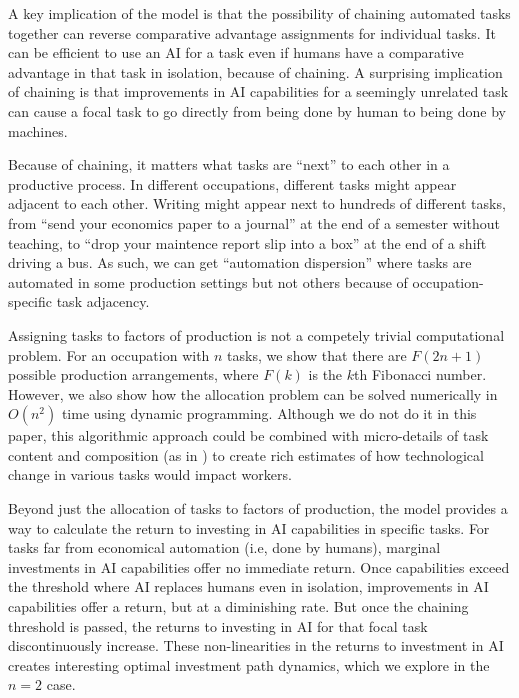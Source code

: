 \documentclass{article}
\begin{document}
A key implication of the model is that the possibility of chaining automated tasks together can reverse comparative advantage assignments for individual tasks. 
It can be efficient to use an AI for a task even if humans have a comparative advantage in that task in isolation, because of chaining.
A surprising implication of chaining is that improvements in AI capabilities for a seemingly unrelated task can cause a focal task to go directly from being done by human to being done by machines.

Because of chaining, it matters what tasks are ``next'' to each other in a productive process.
In different occupations, different tasks might appear adjacent to each other. 
Writing might appear next to hundreds of different tasks, from ``send your economics paper to a journal'' at the end of a semester without teaching, to ``drop your maintence report slip into a box'' at the end of a shift driving a bus.
As such, we can get ``automation dispersion'' where tasks are automated in some production settings but not others because of occupation-specific task adjacency.

Assigning tasks to factors of production is not a competely trivial computational problem.
For an occupation with $n$ tasks, we show that there are $F(2n + 1)$ possible production arrangements, where $F(k)$ is the $k$th Fibonacci number.
However, we also show how the allocation problem can be solved numerically in $O(n^2)$ time using dynamic programming.
Although we do not do it in this paper, this algorithmic approach could be combined with micro-details of task content and composition (as in \cite{frey2017future, felten2021occupational, eloundou2023gpts}) to create rich estimates of how technological change in various tasks would impact workers. 

Beyond just the allocation of tasks to factors of production, the model provides a way to calculate the return to investing in AI capabilities in specific tasks.
For tasks far from economical automation (i.e, done by humans), marginal investments in AI capabilities offer no immediate return.
Once capabilities exceed the threshold where AI replaces humans even in isolation, improvements in AI capabilities offer a return, but at a diminishing rate.
But once the chaining threshold is passed, the returns to investing in AI for that focal task discontinuously increase.
These non-linearities in the returns to investment in AI creates interesting optimal investment path dynamics, which we explore in the $n = 2$ case.
\end{document}
